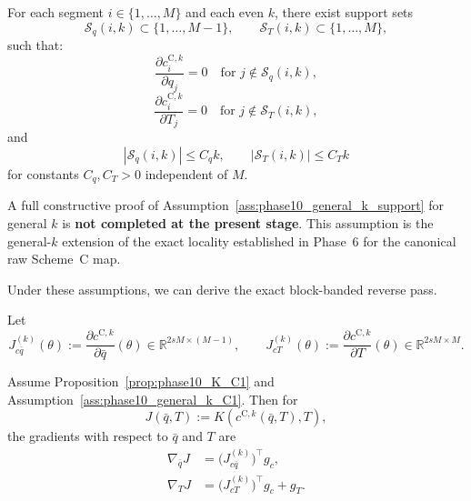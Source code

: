 \begin{assumption}
\label{ass:phase10_general_k_support}
For each segment \(i\in\{1,\dots,M\}\) and each even \(k\), there exist support sets
\[
\mathcal S_q(i,k)\subset \{1,\dots,M-1\},
\qquad
\mathcal S_T(i,k)\subset \{1,\dots,M\},
\]
such that:
\begin{equation}
\label{eq:phase10_support_q}
\frac{\partial c_i^{\mathrm{C},k}}{\partial q_j}=0
\quad \text{for } j\notin \mathcal S_q(i,k),
\end{equation}
\begin{equation}
\label{eq:phase10_support_T}
\frac{\partial c_i^{\mathrm{C},k}}{\partial T_j}=0
\quad \text{for } j\notin \mathcal S_T(i,k),
\end{equation}
and
\begin{equation}
\label{eq:phase10_support_card}
|\mathcal S_q(i,k)|\le C_q k,
\qquad
|\mathcal S_T(i,k)|\le C_T k
\end{equation}
for constants \(C_q,C_T>0\) independent of \(M\).
\end{assumption}

\begin{remark}
\label{rem:phase10_general_k_support_status}
A full constructive proof of Assumption~\ref{ass:phase10_general_k_support} for general \(k\) is \textbf{not completed at the present stage}.
This assumption is the general-\(k\) extension of the exact locality established in Phase~6 for the canonical raw Scheme~C map.
\end{remark}

Under these assumptions, we can derive the exact block-banded reverse pass.

Let
\[
J_{c\bar q}^{(k)}(\theta)
:=
\frac{\partial c^{\mathrm{C},k}}{\partial \bar q}(\theta)
\in \mathbb R^{2sM\times(M-1)},
\qquad
J_{cT}^{(k)}(\theta)
:=
\frac{\partial c^{\mathrm{C},k}}{\partial T}(\theta)
\in \mathbb R^{2sM\times M}.
\]

\begin{theorem}
\label{thm:phase10_chain_rule}
Assume Proposition~\ref{prop:phase10_K_C1} and Assumption~\ref{ass:phase10_general_k_C1}.
Then for
\[
J(\bar q,T):=K(c^{\mathrm{C},k}(\bar q,T),T),
\]
the gradients with respect to \(\bar q\) and \(T\) are
\begin{align}
\label{eq:phase10_grad_q}
\nabla_{\bar q}J
&=
\bigl(J_{c\bar q}^{(k)}\bigr)^\top g_c,\\
\label{eq:phase10_grad_T}
\nabla_T J
&=
\bigl(J_{cT}^{(k)}\bigr)^\top g_c
+
g_T.
\end{align}
\end{theorem}

